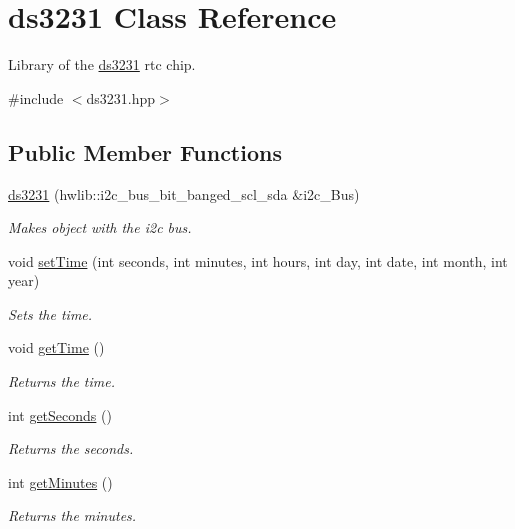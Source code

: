 \hypertarget{classds3231}{}\section{ds3231 Class Reference}
\label{classds3231}


Library of the \hyperlink{classds3231}{ds3231} rtc chip.  




{\ttfamily \#include $<$ds3231.\+hpp$>$}

\subsection*{Public Member Functions}
\begin{DoxyCompactItemize}
\item 
\hyperlink{classds3231_acdd3a6b3ea33bb72460fcc89ea5ef3e9}{ds3231} (hwlib\+::i2c\+\_\+bus\+\_\+bit\+\_\+banged\+\_\+scl\+\_\+sda \&i2c\+\_\+\+Bus)
\begin{DoxyCompactList}\small\item\em Makes object with the i2c bus. \end{DoxyCompactList}\item 
void \hyperlink{classds3231_ac53a311085250d36ae88a851a0b9c250}{set\+Time} (int seconds, int minutes, int hours, int day, int date, int month, int year)
\begin{DoxyCompactList}\small\item\em Sets the time. \end{DoxyCompactList}\item 
void \hyperlink{classds3231_a01dbcd7b91ec0f810dd477b16b58031b}{get\+Time} ()
\begin{DoxyCompactList}\small\item\em Returns the time. \end{DoxyCompactList}\item 
int \hyperlink{classds3231_acf29728b7e035fb3ca09ad9ef8f769d1}{get\+Seconds} ()
\begin{DoxyCompactList}\small\item\em Returns the seconds. \end{DoxyCompactList}\item 
int \hyperlink{classds3231_a87b0afb6d653251f345dbf89bdfa88c4}{get\+Minutes} ()
\begin{DoxyCompactList}\small\item\em Returns the minutes. \end{DoxyCompactList}\item 

\end{DoxyCompactItemize}
